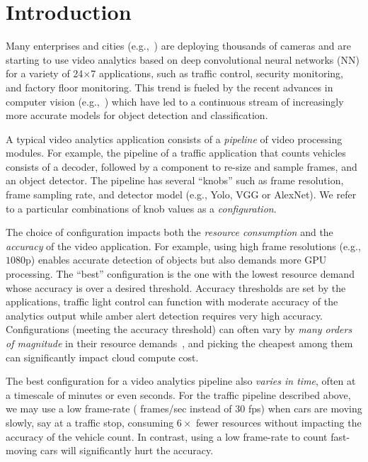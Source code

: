 
\section{Introduction}

Many enterprises and cities (e.g.,~\cite{videonews1,videonews2}) are deploying thousands of cameras and are starting to use video analytics based on deep convolutional neural networks (NN) for a variety of 24$\times$7 applications, such as traffic control, security monitoring, and factory floor monitoring. This trend is fueled by the recent advances in computer vision (e.g.,~\cite{he2016deep,he2017mask}) which have led to a continuous stream of increasingly more accurate models for object detection and classification. 


A typical video analytics application consists of a {\em pipeline} of video processing modules. For example, the pipeline of a traffic application that counts vehicles consists of a decoder, followed by a component to re-size and sample frames, and an object detector. The pipeline has several ``knobs'' such as frame resolution, frame sampling rate, and detector model (e.g., Yolo, VGG or AlexNet). We refer to a particular combinations of knob values as a {\em configuration}. 

The choice of configuration impacts both the {\em resource consumption} and the {\em accuracy} of the video application. For example, using high frame resolutions (e.g., $1080$p) enables accurate detection of objects but also demands more GPU processing. The ``best'' configuration is the one with the lowest resource demand whose accuracy is over a desired threshold. Accuracy thresholds are set by the applications, \eg traffic light control can function with moderate accuracy of the analytics output while amber alert detection requires very high accuracy. Configurations (meeting the accuracy threshold) can often vary by {\em many orders of magnitude} in their resource demands~\cite{videostar,mcdnn}, and picking the cheapest among them can significantly impact cloud compute cost.

The best configuration for a video analytics pipeline also {\em varies in time}, often at a timescale of minutes or even seconds. For the traffic pipeline described above, we may use a low frame-rate ( frames/sec instead of 30 fps) when cars are moving slowly, say at a traffic stop, consuming $6\times$ fewer resources without impacting the accuracy of the vehicle count. In contrast, using a low frame-rate to count fast-moving cars will significantly hurt the accuracy. 

